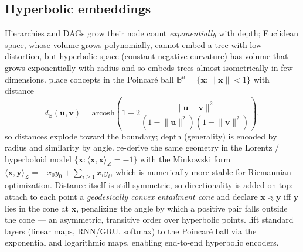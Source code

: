 \subsection{Hyperbolic embeddings}
Hierarchies and DAGs grow their node count \emph{exponentially} with depth;
Euclidean space, whose volume grows polynomially, cannot embed a tree with low
distortion, but hyperbolic space (constant negative curvature) has volume that
grows exponentially with radius and so embeds trees almost isometrically in few
dimensions. \citet{geo:nickel2017poincare} place concepts in the Poincar\'e
ball $\mathbb{B}^n=\{\mathbf{x}:\lVert\mathbf{x}\rVert<1\}$ with distance
\begin{equation}
d_{\mathbb{B}}(\mathbf{u},\mathbf{v}) = \mathrm{arcosh}\!\left(1 +
2\frac{\lVert \mathbf{u}-\mathbf{v}\rVert^2}{(1-\lVert\mathbf{u}\rVert^2)
(1-\lVert\mathbf{v}\rVert^2)}\right),
\end{equation}
so distances explode toward the boundary; depth (generality) is encoded by
radius and similarity by angle. \citet{geo:nickel2018lorentz} re-derive the
same geometry in the Lorentz / hyperboloid model
$\{\mathbf{x}: \langle\mathbf{x},\mathbf{x}\rangle_{\mathcal{L}}=-1\}$ with the
Minkowski form $\langle\mathbf{x},\mathbf{y}\rangle_{\mathcal{L}} = -x_0 y_0 +
\sum_{i\geq1} x_i y_i$, which is numerically more stable for Riemannian
optimization. Distance itself is still symmetric, so directionality is added on
top: \citet{geo:ganea2018cones} attach to each point a \emph{geodesically
convex entailment cone} and declare $\mathbf{x}\preceq\mathbf{y}$ iff
$\mathbf{y}$ lies in the cone at $\mathbf{x}$, penalizing the angle by which a
positive pair falls outside the cone --- an asymmetric, transitive order over
hyperbolic points. \citet{geo:ganea2018hnn} lift standard layers
(linear maps, RNN/GRU, softmax) to the Poincar\'e ball via the exponential and
logarithmic maps, enabling end-to-end hyperbolic encoders.

